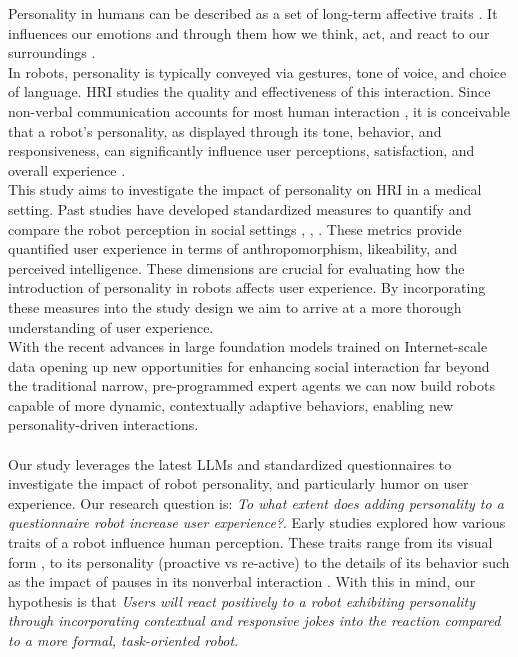 \documentclass[runningheads]{llncs}
\begin{document}
Personality in humans can be described as a set of long-term affective traits \cite{picard}. It influences our emotions and through them how we think, act, and react to our surroundings \cite{Minsky2006}. \\

In robots, personality is typically conveyed via gestures, tone of voice, and choice of language. HRI studies the quality and effectiveness of this interaction. Since non-verbal communication accounts for most human interaction \cite{Mehrabian1967}, it is conceivable that a robot’s personality, as displayed through its tone, behavior, and responsiveness, can significantly influence user perceptions, satisfaction, and overall experience \cite{Mehrabian1967}.\\
This study aims to investigate the impact of personality on HRI in a medical setting. Past studies have developed standardized measures to quantify and compare the robot perception in social settings \cite{Bartneck2009}, \cite{Carpinella2017}, \cite{Heerink2010}. These metrics provide quantified user experience in terms of anthropomorphism, likeability, and perceived intelligence. These dimensions are crucial for evaluating how the introduction of personality in robots affects user experience. By incorporating these measures into the study design we aim to arrive at a more thorough understanding of user experience.\\

With the recent advances in large foundation models trained on Internet-scale data opening up new opportunities for enhancing social interaction far beyond the traditional narrow, pre-programmed expert agents we can now build robots capable of more dynamic, contextually adaptive behaviors, enabling new personality-driven interactions.
\\\\
Our study leverages the latest LLMs and standardized questionnaires to investigate the impact of robot personality, and particularly humor on user experience. Our research question is: \textit{To what extent does adding personality to a questionnaire robot increase user experience?}. Early studies explored how various traits of a robot influence human perception. These traits range from its visual form \cite{Carpinella2017}, to its personality (proactive vs re-active) to the details of its behavior such as the impact of pauses in its nonverbal interaction \cite{Admoni2014}. With this in mind, our hypothesis is that \textit{Users will react positively to a robot exhibiting personality through incorporating contextual and responsive jokes into the reaction compared to a more formal, task-oriented robot}.
\end{document}
